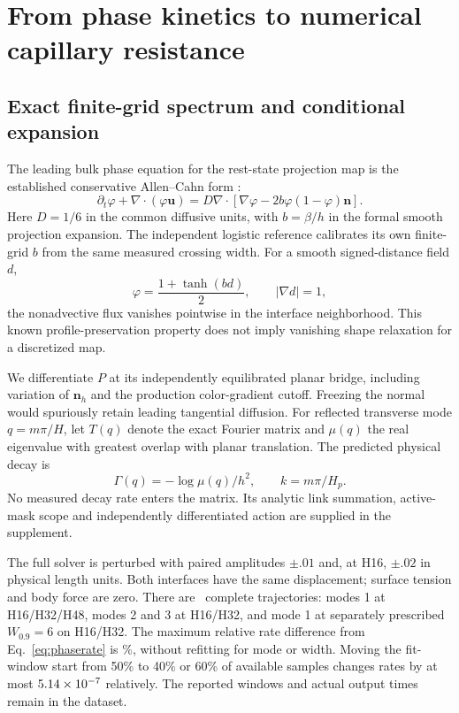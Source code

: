 \section{From phase kinetics to numerical capillary resistance}
\label{sec:phasekinetics}
\subsection{Exact finite-grid spectrum and conditional expansion}
The leading bulk phase equation for the rest-state projection map is the
established conservative Allen--Cahn form \cite{subhedar2020}:
\begin{equation}\label{eq:leadingphase}
 \partial_t\varphi+\nabla\cdot(\varphi\bm u)
 =D\nabla\cdot[\nabla\varphi-2b\varphi(1-\varphi)\bm n].
\end{equation}
Here $D=1/6$ in the common diffusive units, with $b=\beta/h$ in the formal
smooth projection expansion. The independent logistic reference calibrates
its own finite-grid $b$ from the same measured crossing width.
For a smooth signed-distance field $d$,
\begin{equation}
 \varphi=\frac{1+\tanh(bd)}2,\qquad |\nabla d|=1,
\end{equation}
the nonadvective flux vanishes pointwise in the interface neighborhood.
This known profile-preservation property \cite{mirjalili2020,hao2024}
does not imply vanishing shape relaxation for a discretized map.

We differentiate $P$ at its independently equilibrated planar bridge,
including variation of $\bm n_h$ and the production color-gradient cutoff.
Freezing the normal would spuriously retain leading tangential diffusion.
For reflected transverse mode $q=m\pi/H$, let $T(q)$ denote the exact
Fourier matrix and $\mu(q)$ the real eigenvalue with greatest overlap with
planar translation. The predicted physical decay is
\begin{equation}\label{eq:phaserate}
 \Gamma(q)=-\log\mu(q)/h^2,\qquad k=m\pi/H_p.
\end{equation}
No measured decay rate enters the matrix. Its analytic link summation,
active-mask scope and independently differentiated action are supplied
in the supplement.

The full solver is perturbed with paired amplitudes $\pm.01$ and, at H16,
$\pm.02$ in physical length units. Both interfaces have the same displacement;
surface tension and body force are zero. There are \MajorWaveCount\
complete trajectories: modes 1 at H16/H32/H48, modes 2 and 3 at H16/H32,
and mode 1 at separately prescribed $W_{0.9}=6$ on H16/H32.
The maximum relative rate difference from Eq.~\eqref{eq:phaserate} is
\MajorWavePercent\%, without refitting for mode or width.
Moving the fit-window start from 50\% to 40\% or 60\% of available samples
changes rates by at most $5.14\times10^{-7}$ relatively.
The reported windows and actual output times remain in the dataset.

